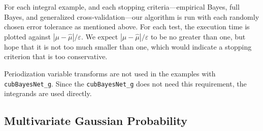 \documentclass{svjour3}                     %
\newcommand{\hmu}{\widehat{\mu}}
\newcommand{\code}[1]{\texttt{#1}}
\def\abs#1{\ensuremath{\left \lvert #1 \right \rvert}}
\newcommand\secref{Section~\ref}
\begin{document}
For each integral example, and each stopping criteria---empirical Bayes, full Bayes, and generalized cross-validation---our algorithm is run with each randomly chosen error tolerance as mentioned above.  For each test, the execution time is plotted against $\abs{\mu - \hmu}/\varepsilon$.  We expect $\abs{\mu - \hmu}/\varepsilon$ to be no greater than one, but hope that it is not too much smaller than one, which would indicate a stopping criterion that is too conservative.


Periodization variable transforms are not used in the examples with \\ \allowbreak \code{cubBayesNet\_g}. Since the \allowbreak \code{cubBayesNet\_g} does not need this requirement, the integrands are used directly.



\subsection{Multivariate Gaussian Probability}
\end{document}
